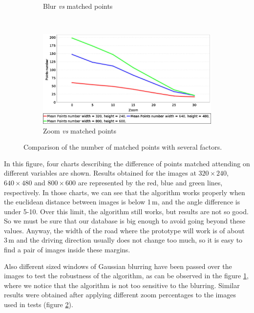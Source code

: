 \begin{figure}[t]
\begin{subfigure}[b]{0.45\textwidth}
	  \caption{Blur \emph{vs} matched points}\label{fig:cp01_blur_vs_matched}
        \end{subfigure}%
        ~
        \begin{subfigure}[b]{0.45\textwidth}
	    \includegraphics[width=\textwidth]{zoomVsMatches}
	  \caption{Zoom \emph{vs} matched points}\label{fig:cp01_zoom_vs_matched}
        \end{subfigure}%
        \caption{Comparison of the number of matched points with several factors.}\label{fig:cp01_matching_results}
\end{figure}

In this figure, four charts describing the difference of points matched attending on different variables are shown. Results obtained for the images at $320 \times 240$, $640 \times 480$ and $800 \times 600$ are represented by the red, blue and green lines, respectively. In those charts, we can see that the algorithm works properly when the euclidean distance between images is below 1\,m, and the angle difference is under 5-10\textdegree. Over this limit, the algorithm still works, but results are not so good. So we must be sure that our database is big enough to avoid going beyond these values. Anyway, the width of the road where the prototype will work is of about 3\,m and the driving direction usually does not change too much, so it is easy to find a pair of images inside these margins.

Also different sized windows of Gaussian blurring have been passed over the images to test the robustness of the algorithm, as can be observed in the figure \ref{fig:cp01_blur_vs_matched}, where we notice that the algorithm is not too sensitive to the blurring. Similar results were obtained after applying different zoom percentages to the images used in tests (figure \ref{fig:cp01_zoom_vs_matched}).

